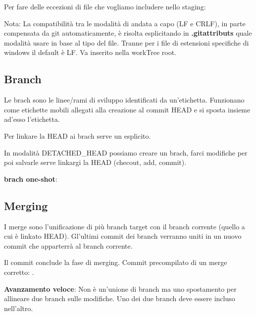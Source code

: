 
Per fare delle eccezioni di file che vogliamo includere nello staging:



Nota: La compatibilità tra le modalità di andata a capo (LF e CRLF), in parte compensata da git automaticamente, è risolta esplicitando in \textbf{.gitattributs} quale modalità usare in base al tipo del file. Tranne per i file di estensioni specifiche di windows il default è LF. Va inserito nella workTree root.

\subsection{Branch}
Le brach sono le linee/rami di sviluppo identificati da un'etichetta. Funzionano come etichette mobili allegati alla creazione al commit HEAD e si sposta insieme ad'esso l'etichetta.

Per linkare la HEAD ai brach serve un  esplicito.


In modalità DETACHED\_HEAD possiamo creare un brach, farci modifiche per poi salvarle serve linkargi la HEAD (checout, add, commit).

\textbf{brach one-shot}: 

\subsection{Merging}
I merge sono l'unificazione di più branch target con il branch corrente (quello a cui è linkato HEAD). Gl'ultimi commit dei branch verranno uniti in un nuovo commit che apparterrà al branch corrente.


Il commit conclude la fase di merging. Commit precompilato di un merge corretto: .

\textbf{Avanzamento veloce}: Non è un'unione di branch ma uno spostamento per allineare due branch sulle modifiche. Uno dei due branch deve essere incluso nell'altro.